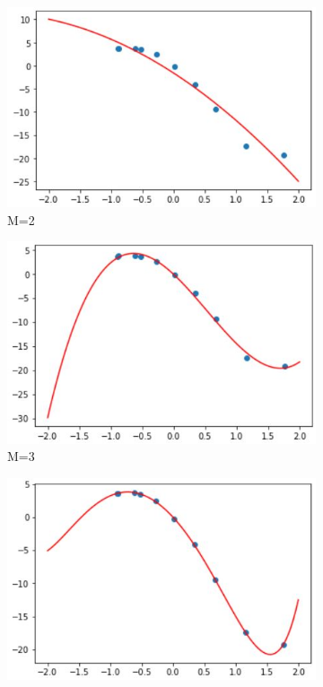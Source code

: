 \documentclass[11pt]{article}
\begin{document}
\begin{figure}[h]
\centering
	\begin{subfigure}[b]{0.45\textwidth}
	\centering
	\includegraphics[scale=0.7]{dataset1_10_lambda0_m2funcplot.jpg}
	\caption{    M=2}
	\label{fig:fig1.1.1.1}
	\end{subfigure}
	\hfill
	\begin{subfigure}[b]{0.45\textwidth}
	\centering
	\includegraphics[scale=0.7]{dataset1_10_lambda0_m3funcplot.jpg}
	\caption{    M=3}
	\label{fig:fig1.1.1.2}
	\end{subfigure}
	\hfill
	\begin{subfigure}[b]{0.45\textwidth}
	\centering
	\includegraphics[scale=0.7]{dataset1_10_lambda0_m6funcplot.jpg}

\end{subfigure}
\end{figure}
\end{document}
